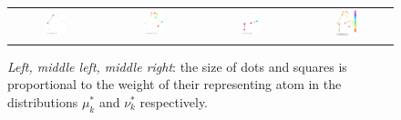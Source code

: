 \begin{figure}[h!]
\begin{tabular}{@{}c@{}c@{}c@{}c@{}}
\includegraphics[width=0.23\textwidth]{figures/dual_MOT_1_norm.pdf}&
\includegraphics[width=0.23\textwidth]{figures/dual_MOT_2_norm.pdf}&
\includegraphics[width=0.23\textwidth]{figures/dual_MOT_3_norm.pdf}&
\includegraphics[width=0.268\textwidth]{figures/dual_MOT_1_2_3_norm.pdf}
\end{tabular}
\caption{\emph{Left, middle left, middle right}: the size of dots and squares is proportional to the weight of their representing atom in the distributions $\mu_k^{*}$ and $\nu_k^{*}$ respectively. %
}
\end{figure}
